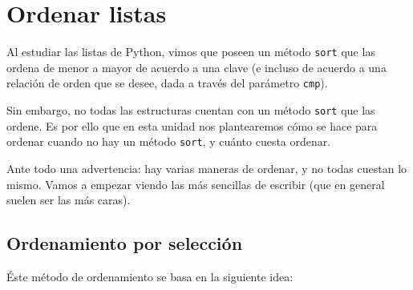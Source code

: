 
%

\chapter{Ordenar listas}

Al estudiar las listas de Python, vimos que poseen un método \lstinline!sort!
que las ordena de menor a mayor de acuerdo a una clave (e incluso de acuerdo a
una relación de orden que se desee, dada a través del parámetro
\lstinline!cmp!).

Sin embargo, no todas las estructuras cuentan con un método
\lstinline!sort! que las ordene.  Es por ello que en esta unidad nos
plantearemos cómo se hace para ordenar cuando no hay un método
\lstinline!sort!, y cuánto cuesta ordenar.

Ante todo una advertencia: hay varias maneras de ordenar, y no todas
cuestan lo mismo. Vamos a empezar viendo las más sencillas de escribir
(que en general suelen ser las más caras).

\section{Ordenamiento por selección}
Éste método de ordenamiento se basa en la siguiente idea:

